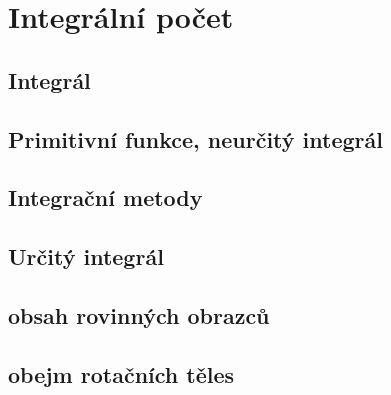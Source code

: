 
\newpage
    \section{Integrální počet}
        \subsection{Integrál}
        \subsection{Primitivní funkce, neurčitý integrál}
        \subsection{Integrační metody}
        \subsection{Určitý integrál}
        \subsection{obsah rovinných obrazců}
        \subsection{obejm rotačních těles}
